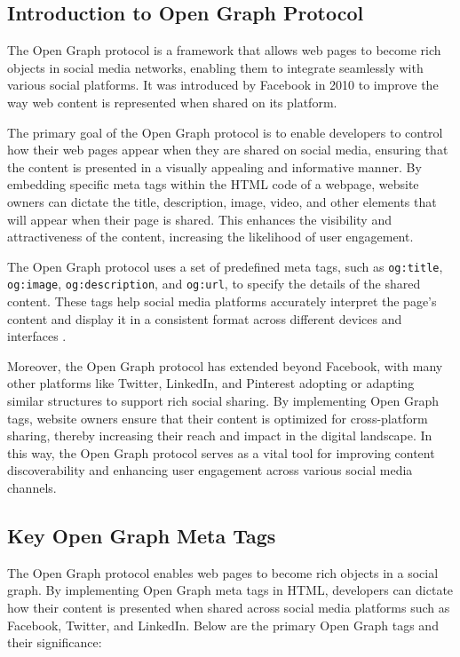 \subsection{Introduction to Open Graph Protocol}
\label{subsec:introduction_to_open_graph_protocol}
The Open Graph protocol is a framework that allows web pages to become rich objects in social media networks, enabling them to integrate seamlessly with various social platforms. 
It was introduced by Facebook in 2010 to improve the way web content is represented when shared on its platform.

The primary goal of the Open Graph protocol is to enable developers to control how their web pages appear when they are shared on social media, ensuring that the content is presented in a visually appealing and informative manner. 
By embedding specific meta tags within the HTML code of a webpage, website owners can dictate the title, description, image, video, and other elements that will appear when their page is shared. 
This enhances the visibility and attractiveness of the content, increasing the likelihood of user engagement.

The Open Graph protocol uses a set of predefined meta tags, such as \texttt{og:title}, \texttt{og:image}, \texttt{og:description}, and \texttt{og:url}, to specify the details of the shared content.
These tags help social media platforms accurately interpret the page's content and display it in a consistent format across different devices and interfaces \cite{w3c_open_graph}.

Moreover, the Open Graph protocol has extended beyond Facebook, with many other platforms like Twitter, LinkedIn, and Pinterest adopting or adapting similar structures to support rich social sharing. 
By implementing Open Graph tags, website owners ensure that their content is optimized for cross-platform sharing, thereby increasing their reach and impact in the digital landscape. 
In this way, the Open Graph protocol serves as a vital tool for improving content discoverability and enhancing user engagement across various social media channels.

\subsection{Key Open Graph Meta Tags}
\label{subsec:key_open_graph_meta_tags}

The Open Graph protocol enables web pages to become rich objects in a social graph. By implementing Open Graph meta tags in HTML, developers can dictate how their content is presented when shared across social media platforms such as Facebook, Twitter, and LinkedIn. Below are the primary Open Graph tags and their significance:

